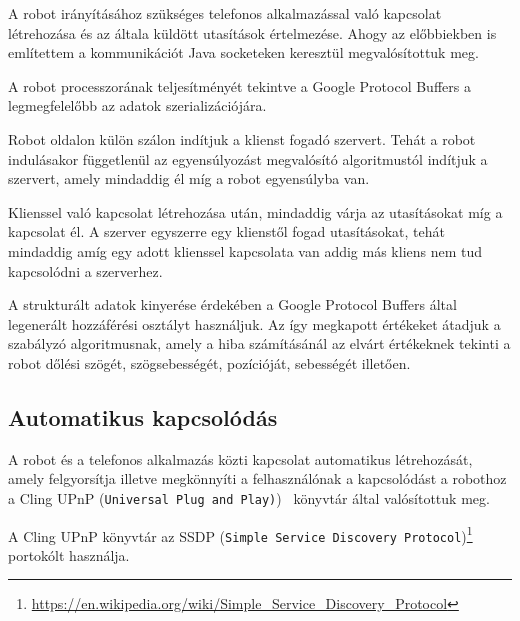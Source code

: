 A robot irányításához szükséges telefonos alkalmazással való kapcsolat létrehozása és az általa küldött utasítások értelmezése. Ahogy az előbbiekben is említettem a kommunikációt Java socketeken keresztül megvalósítottuk meg.

A robot processzorának teljesítményét tekintve a Google Protocol Buffers a legmegfelelőbb az adatok szerializációjára.

Robot oldalon külön szálon indítjuk a klienst fogadó szervert. Tehát a robot indulásakor függetlenül az egyensúlyozást megvalósító algoritmustól indítjuk a szervert, amely mindaddig él míg a robot egyensúlyba van.

Klienssel való kapcsolat létrehozása után, mindaddig várja az utasításokat míg a kapcsolat él. A szerver egyszerre egy klienstől fogad utasításokat, tehát mindaddig amíg egy adott klienssel kapcsolata van addig más kliens nem tud kapcsolódni a szerverhez.

A strukturált adatok kinyerése érdekében a Google Protocol Buffers által legenerált hozzáférési osztályt használjuk. Az így megkapott értékeket átadjuk a szabályzó algoritmusnak, amely a hiba számításánál az elvárt értékeknek tekinti a robot dőlési szögét, szögsebességét, pozícióját, sebességét illetően.

\subsection{Automatikus kapcsolódás}

A robot és a telefonos alkalmazás közti kapcsolat automatikus létrehozását, amely felgyorsítja illetve megkönnyíti a felhasználónak a kapcsolódást a robothoz a Cling UPnP (\texttt{Universal Plug and Play)})~\cite{upnp} könyvtár által valósítottuk meg.

A Cling UPnP könyvtár az SSDP (\texttt{Simple Service Discovery Protocol})\footnote{\href{https://en.wikipedia.org/wiki/Simple\_Service\_Discovery\_Protocol}{https://en.wikipedia.org/wiki/Simple\_Service\_Discovery\_Protocol}} portokólt használja.

